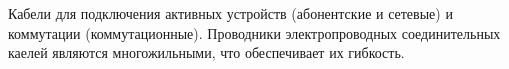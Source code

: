 Кабели для подключения активных устройств (абонентские и сетевые)
и коммутации (коммутационные). Проводники электропроводных
соединительных каелей являются многожильными, что обеспечивает их гибкость.